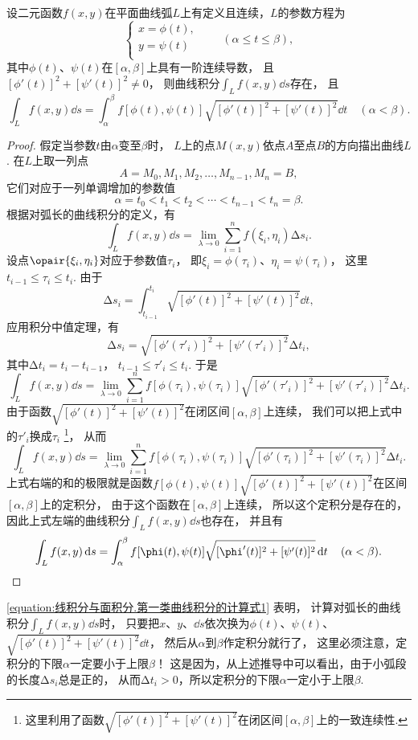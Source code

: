 \begin{theorem}
设二元函数\(f(x,y)\)在平面曲线弧\(L\)上有定义且连续，\(L\)的参数方程为\[
\left\{ \begin{array}{l}
x = \phi(t), \\
y = \psi(t) \\
\end{array} \right.
\qquad
(\alpha \leq t \leq \beta),
\]其中\(\phi(t)\)、\(\psi(t)\)在\([\alpha,\beta]\)上具有一阶连续导数，
且\([\phi'(t)]^2+[\psi'(t)]^2 \neq 0\)，
则曲线积分\(\int_L f(x,y) \dd{s}\)存在，
且\begin{equation}\label{equation:线积分与面积分.第一类曲线积分的计算式1}
\int_L f(x,y) \dd{s}
= \int_\alpha^\beta f[\phi(t),\psi(t)] \sqrt{[\phi'(t)]^2+[\psi'(t)]^2} \dd{t}
\quad(\alpha<\beta).
\end{equation}
\begin{proof}
假定当参数\(t\)由\(\alpha\)变至\(\beta\)时，
\(L\)上的点\(M(x,y)\)依点\(A\)至点\(B\)的方向描出曲线\(L\).
在\(L\)上取一列点\[
A=M_0,M_1,M_2,\dotsc,M_{n-1},M_n=B,
\]它们对应于一列单调增加的参数值\[
\alpha=t_0<t_1<t_2<\dotsb<t_{n-1}<t_n=\beta.
\]根据对弧长的曲线积分的定义，有\[
\int_L f(x,y) \dd{s} = \lim\limits_{\lambda\to0} \sum\limits_{i=1}^n f(\xi_i,\eta_i) \increment s_i.
\]设点\(\opair{\xi_i,\eta_i}\)对应于参数值\(\tau_i\)，
即\(\xi_i=\phi(\tau_i)\)、\(\eta_i=\psi(\tau_i)\)，
这里\(t_{i-1}\leq\tau_i\leq t_i\).
由于\[
\increment s_i = \int_{t_{i-1}}^{t_i} \sqrt{[\phi'(t)]^2+[\psi'(t)]^2} \dd{t},
\]应用积分中值定理，有\[
\increment s_i = \sqrt{[\phi'(\tau'_i)]^2+[\psi'(\tau'_i)]^2} \increment t_i,
\]其中\(\increment t_i = t_i - t_{i-1}\)，
\(t_{i-1} \leq \tau'_i \leq t_i\).
于是\[
\int_L f(x,y) \dd{s}
= \lim\limits_{\lambda\to0} \sum\limits_{i=1}^n f[\phi(\tau_i),\psi(\tau_i)] \sqrt{[\phi'(\tau'_i)]^2+[\psi'(\tau'_i)]^2} \increment t_i.
\]由于函数\(\sqrt{[\phi'(t)]^2+[\psi'(t)]^2}\)在闭区间\([\alpha,\beta]\)上连续，
我们可以把上式中的\(\tau'_i\)换成\(\tau_i\)
\footnote{这里利用了函数\(\sqrt{[\phi'(t)]^2+[\psi'(t)]^2}\)在闭区间\([\alpha,\beta]\)上的一致连续性.}，
从而\[
\int_L f(x,y) \dd{s}
= \lim\limits_{\lambda\to0} \sum\limits_{i=1}^n f[\phi(\tau_i),\psi(\tau_i)] \sqrt{[\phi'(\tau_i)]^2+[\psi'(\tau_i)]^2} \increment t_i.
\]上式右端的和的极限就是函数\(f[\phi(t),\psi(t)] \sqrt{[\phi'(t)]^2+[\psi'(t)]^2}\)在区间\([\alpha,\beta]\)上的定积分，
由于这个函数在\([\alpha,\beta]\)上连续，
所以这个定积分是存在的，
因此上式左端的曲线积分\(\int_L f(x,y) \dd{s}\)也存在，
并且有\[
\int_L f(x,y) \dd{s}
=\int_\alpha^\beta
 f[\phi(t),\psi(t)]
 \sqrt{[\phi'(t)]^2+[\psi'(t)]^2}
 \dd{t}
\quad(\alpha<\beta).
\qedhere
\]
\end{proof}
\end{theorem}
\cref{equation:线积分与面积分.第一类曲线积分的计算式1} 表明，
计算对弧长的曲线积分\(\int_L f(x,y) \dd{s}\)时，
只要把\(x\)、\(y\)、\(\dd{s}\)依次换为\(\phi(t)\)、\(\psi(t)\)、\(\sqrt{[\phi'(t)]^2+[\psi'(t)]^2} \dd{t}\)，
然后从\(\alpha\)到\(\beta\)作定积分就行了，
这里必须注意，定积分的下限\(\alpha\)一定要小于上限\(\beta\)！
这是因为，从上述推导中可以看出，由于小弧段的长度\(\increment s_i\)总是正的，
从而\(\increment t_i > 0\)，所以定积分的下限\(\alpha\)一定小于上限\(\beta\).

